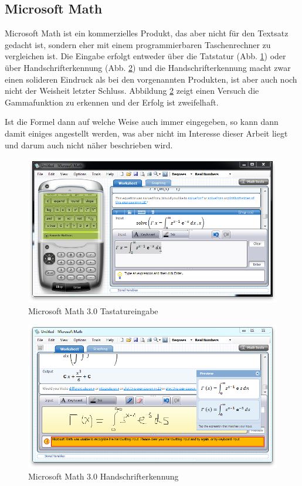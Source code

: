\subsection{Microsoft Math}

Microsoft Math ist ein kommerzielles Produkt, das aber nicht für den Textsatz gedacht ist, sondern eher mit einem programmierbaren Taschenrechner zu vergleichen ist. Die Eingabe erfolgt entweder über die Tatstatur (Abb. \ref{fig:ms-math-keyboard}) oder über Handschrifterkennung (Abb. \ref{fig:ms-math-ink}) und die Handschrifterkennung macht zwar einen solideren Eindruck als bei den vorgenannten Produkten, ist aber auch noch nicht der Weisheit letzter Schluss. Abbildung \ref{fig:ms-math-ink} zeigt einen Versuch die Gammafunktion zu erkennen und der Erfolg ist zweifelhaft.

Ist die Formel dann auf welche Weise auch immer eingegeben, so kann dann damit einiges angestellt werden, was aber nicht im Interesse dieser Arbeit liegt und darum auch nicht näher beschrieben wird.

\begin{figure}
  \begin{center}
    \includegraphics[width=.8\textwidth]{figures/ms-math-keyboard.png}
  \end{center}
  \caption{Microsoft Math 3.0 Tastatureingabe}
  \label{fig:ms-math-keyboard}
\end{figure}

\begin{figure}
  \begin{center}
    \includegraphics[width=.8\textwidth]{figures/ms-math-ink.png}
  \end{center}
  \caption{Microsoft Math 3.0 Handschrifterkennung}
  \label{fig:ms-math-ink}
\end{figure}


